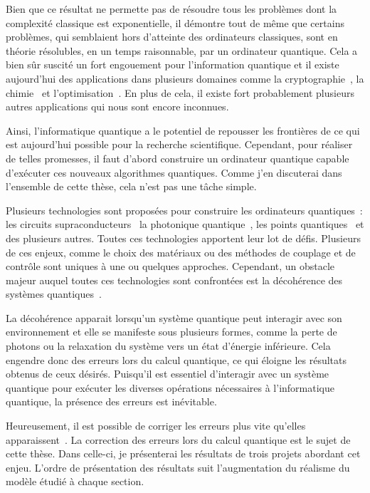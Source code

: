 Bien que ce résultat ne permette pas de résoudre tous les problèmes dont la complexité classique
est exponentielle,
il démontre tout de même que certains problèmes,
qui semblaient hors d'atteinte des ordinateurs classiques,
sont en théorie résolubles, en un temps raisonnable, par un ordinateur quantique.
Cela a bien sûr suscité un fort engouement pour l'information quantique et
il existe aujourd'hui des applications dans plusieurs domaines comme
la cryptographie~\cite{bennett_quantum_2014, gisin_quantum_2002}, 
la chimie~\cite{lanyon_towards_2010, mcardle_quantum_2020, cao_quantum_2019} 
et l'optimisation~\cite{montanaro_quantum_2016, grover_quantum_1997}.
En plus de cela,
il existe fort probablement plusieurs autres applications qui nous sont encore inconnues.

Ainsi,
l'informatique quantique a le potentiel de repousser les frontières de ce qui est aujourd'hui
possible pour la recherche scientifique.
Cependant,
pour réaliser de telles promesses,
il faut d'abord construire un ordinateur quantique capable d'exécuter ces nouveaux algorithmes quantiques.
Comme j'en discuterai dans l'ensemble de cette thèse,
cela n'est pas une tâche simple.

Plusieurs technologies sont proposées pour construire les ordinateurs quantiques~:
les circuits supraconducteurs~\cite{wallraff_strong_2004, krantz_quantum_2019}
la photonique quantique~\cite{obrien_photonic_2009, kok_linear_2007},
les points quantiques~\cite{pioro-ladriere_electrically_2008, loss_quantum_1998}
et des plusieurs autres.
Toutes ces technologies apportent leur lot de défis.
Plusieurs de ces enjeux,
comme le choix des matériaux ou
des méthodes de couplage et de contrôle
sont uniques à une ou quelques approches.
Cependant,
un obstacle majeur auquel toutes ces technologies sont confrontées
est la décohérence des systèmes quantiques~\cite{unruh_maintaining_1995, palma_quantum_1996}.

La décohérence apparait lorsqu'un système quantique peut interagir avec son environnement
et elle se manifeste sous plusieurs formes, 
comme la perte de photons ou la relaxation du système vers un état d'énergie inférieure.
Cela engendre donc des erreurs lors du calcul quantique,
ce qui éloigne les résultats obtenus de ceux désirés.
Puisqu'il est essentiel d'interagir avec un système quantique pour exécuter les diverses 
opérations nécessaires à l'informatique quantique,
la présence des erreurs est inévitable.

Heureusement,
il est possible de corriger les erreurs plus vite qu'elles apparaissent~\cite{aharonov_fault-tolerant_1999}.
La correction des erreurs lors du calcul quantique est le sujet de cette thèse.
Dans celle-ci,
je présenterai les résultats de trois projets abordant cet enjeu.
L'ordre de présentation des résultats suit l'augmentation du réalisme du modèle étudié à chaque section.

